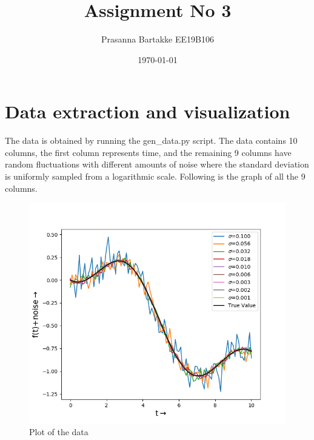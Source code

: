 \documentclass[11pt, a4paper]{article}
\title{Assignment No 3} %
\author{Prasanna Bartakke EE19B106} %
\date{\today} %
\begin{document}
		
		
\maketitle %
\section{Data extraction and visualization}
The data is obtained by running the gen\_data.py script. The data contains 10 columns, the first column represents time, and the remaining 9 columns have random fluctuations with different amounts of noise where the standard deviation is uniformly sampled from a logarithmic scale. Following is the graph of all the 9 columns. 
   \begin{figure}[!tbh]
   	\centering
   	\includegraphics[scale=0.5]{data.png}  %
   	\caption{Plot of the data}
   	\label{fig:fig1}
   \end{figure} 
\end{document}
